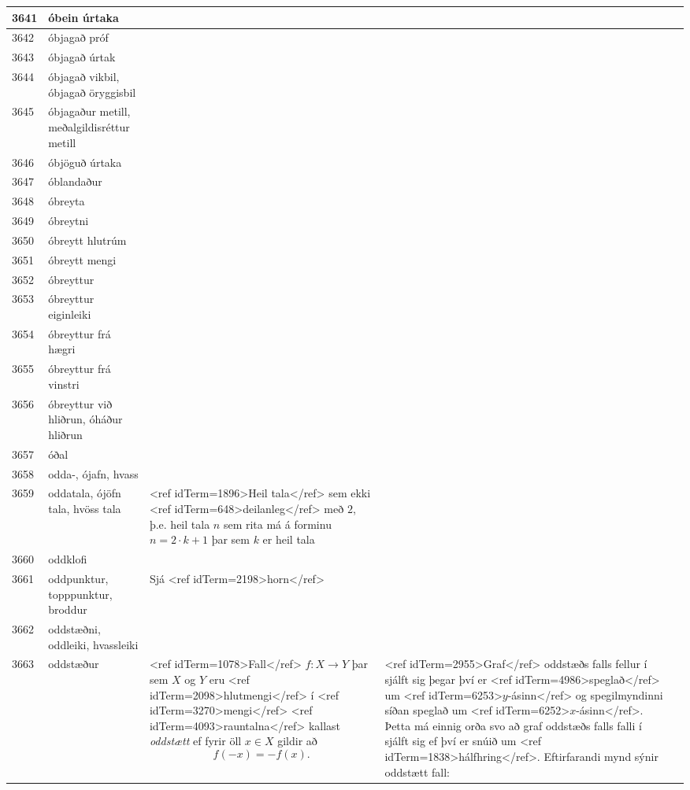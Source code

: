 \begin{longtable}{p{}|p{}|p{}|p{}|p{}}
\hline
3641 & óbein úrtaka &  &  &  \\
\hline
3642 & óbjagað próf &  &  &  \\
\hline
3643 & óbjagað úrtak &  &  &  \\
\hline
3644 & óbjagað vikbil, óbjagað öryggisbil &  &  &  \\
\hline
3645 & óbjagaður metill, meðalgildisréttur metill &  &  &  \\
\hline
3646 & óbjöguð úrtaka &  &  &  \\
\hline
3647 & óblandaður &  &  &  \\
\hline
3648 & óbreyta &  &  &  \\
\hline
3649 & óbreytni &  &  &  \\
\hline
3650 & óbreytt hlutrúm &  &  &  \\
\hline
3651 & óbreytt mengi &  &  &  \\
\hline
3652 & óbreyttur &  &  &  \\
\hline
3653 & óbreyttur eiginleiki &  &  &  \\
\hline
3654 & óbreyttur frá hægri &  &  &  \\
\hline
3655 & óbreyttur frá vinstri &  &  &  \\
\hline
3656 & óbreyttur við hliðrun, óháður hliðrun &  &  &  \\
\hline
3657 & óðal &  &  &  \\
\hline
3658 & odda-, ójafn, hvass &  &  &  \\
\hline
3659 & oddatala, ójöfn tala, hvöss tala & <ref idTerm=1896>Heil tala</ref> sem ekki <ref idTerm=648>deilanleg</ref> með $2$, þ.e. heil tala $n$ sem rita má á forminu $n = 2 \cdot k + 1$ þar sem $k$ er heil tala &  &  \\
\hline
3660 & oddklofi &  &  &  \\
\hline
3661 & oddpunktur, topppunktur, broddur & Sjá <ref idTerm=2198>horn</ref> &  &  \\
\hline
3662 & oddstæðni, oddleiki, hvassleiki &  &  &  \\
\hline
3663 & oddstæður & <ref idTerm=1078>Fall</ref> $f: X \to Y$ þar sem $X$ og $Y$ eru <ref idTerm=2098>hlutmengi</ref> í <ref idTerm=3270>mengi</ref> <ref idTerm=4093>rauntalna</ref> kallast \textit{oddstætt} ef fyrir öll $x \in X$ gildir að \[ f(-x) = - f(x). \] & <ref idTerm=2955>Graf</ref> oddstæðs falls fellur í sjálft sig þegar því er <ref idTerm=4986>speglað</ref> um <ref idTerm=6253>$y$-ásinn</ref> og spegilmyndinni síðan speglað um <ref idTerm=6252>$x$-ásinn</ref>. Þetta má einnig orða svo að graf oddstæðs falls falli í sjálft sig ef því er snúið um <ref idTerm=1838>hálfhring</ref>. Eftirfarandi mynd sýnir oddstætt fall:


\end{longtable}
